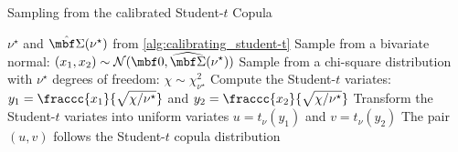 \documentclass[12pt,a4paper]{article}
\begin{document}
\begin{algorithm}[H]
\label{alg:sampling_student-t}
\caption{Sampling from the calibrated Student-$t$ Copula}
\begin{algorithmic}[1]
\Require $\nu^\star$ and $\hat{\mbf \Sigma}(\nu^\star)$ from \cref{alg:calibrating_student-t}
\State Sample from a bivariate normal: $\displaystyle (x_1, x_2) \sim \mathcal{N}(\mbf 0, \widehat{\mbf \Sigma}(\nu^{\star}))$ 
\State Sample from a chi-square distribution with $\nu^\star$ degrees of freedom: $\displaystyle \chi \sim \chi^2_{\nu^\star}$
\State Compute the Student-$t$ variates: $y_1 = \fraccc{x_1}{\sqrt{\chi/\nu^{\star}}}$ and $y_2 = \fraccc{x_2}{\sqrt{\chi/\nu^{\star}}}$
\State Transform the Student-$t$ variates into uniform variates %
$u = t_{\nu}(y_1)$ and $v = t_{\nu}(y_2)$ 
\Ensure The pair $(u,v)$ follows the Student-$t$ copula distribution
\end{algorithmic}
\end{algorithm}
\end{document}
